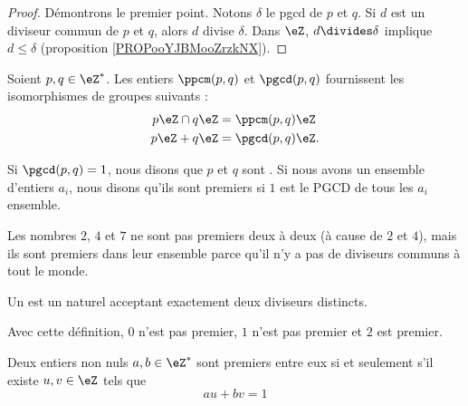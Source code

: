 \begin{proof}
    Démontrons le premier point. Notons \( \delta\) le pgcd de \( p\) et \( q\). Si \( d\) est un diviseur commun de \( p\) et \( q\), alors \( d\) divise \( \delta\). Dans \( \eZ\), \( d\divides \delta\) implique \( d\leq\delta\) (proposition \ref{PROPooYJBMooZrzkNX}).
\end{proof}

\begin{lemma}
    Soient \( p,q\in\eZ^*\). Les entiers \( \ppcm(p,q)\) et \( \pgcd(p,q)\) fournissent les isomorphismes de groupes suivants :
\begin{subequations}
    \begin{align}
        p\eZ\cap q\eZ&=\ppcm(p,q)\eZ\\
        p\eZ + q\eZ&=\pgcd(p,q)\eZ.
    \end{align}
\end{subequations}
\end{lemma}

\begin{definition}  \label{DefZHRXooNeWIcB}
    Si \( \pgcd(p,q)=1\), nous disons que \( p\) et \( q\) sont . Si nous avons un ensemble d'entiers \( a_i\), nous disons qu'ils sont premiers  si \( 1\) est le PGCD de tous les \( a_i\) ensemble.
\end{definition}

Les nombres \( 2\), \( 4\) et \( 7\) ne sont pas premiers deux à deux (à cause de \( 2\) et \( 4\)), mais ils sont premiers dans leur ensemble parce qu'il n'y a pas de diviseurs communs à tout le monde.

\begin{definition}
    Un  est un naturel acceptant exactement deux diviseurs distincts.
\end{definition}
Avec cette définition, \( 0\) n'est pas premier, \( 1\) n'est pas premier et \( 2\) est premier.

\begin{theorem} \label{ThoBuNjam}
    Deux entiers non nuls \( a,b\in\eZ^*\) sont premiers entre eux si et seulement s'il existe \( u,v\in\eZ\) tels que
    \begin{equation}
        au+bv=1
    \end{equation}
\end{theorem}

